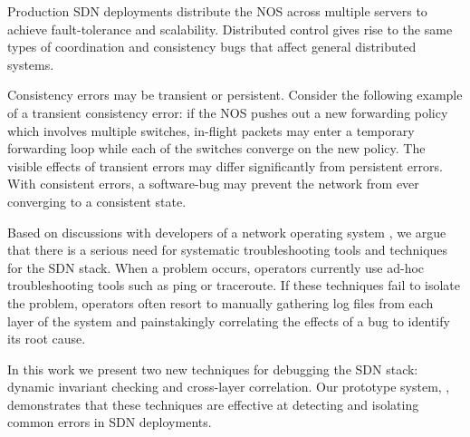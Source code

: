 
Production SDN deployments distribute the NOS across multiple servers to achieve fault-tolerance
and scalability. Distributed control gives rise to the same types of coordination
and consistency bugs that affect general distributed systems.

Consistency errors may be transient or persistent. Consider the following example of a transient
consistency error: if the NOS pushes out a new forwarding policy
which involves multiple switches, in-flight packets may enter a
temporary forwarding loop while each of the switches converge on the new policy.
The visible effects of transient errors may differ significantly from persistent errors.
With consistent errors, a software-bug may prevent the network from ever converging to a consistent
state. 





Based on discussions with developers of a network operating system
\cite{Nicira}, we argue that there is a serious need for systematic troubleshooting
tools and techniques for the SDN stack. When a problem occurs,
operators currently use ad-hoc troubleshooting tools such as ping or traceroute.
If these techniques fail to isolate the problem, operators often resort to
manually gathering log files from each layer of the system and painstakingly
correlating the effects of a bug to identify its root cause.

In this work we present two new techniques for debugging the SDN stack:
dynamic invariant checking and cross-layer correlation. Our prototype system,
\projectname{}, demonstrates that these techniques are effective at detecting and
isolating common errors in SDN deployments.

